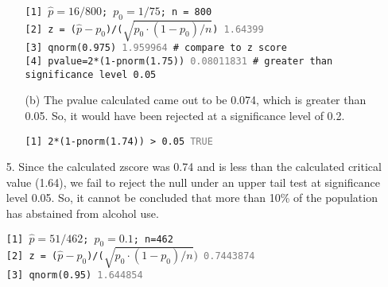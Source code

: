 \documentclass[12pt]{article}
\begin{document}
\begin{enumerate}
\begin{enumerate}
		\begin{tcolorbox}[colback=white, title=Work, coltitle=white]
			\texttt{[1] $\hat{p}=16/800$; $p_0 = 1/75$; n = 800}\\
			\texttt{[2] z = ($\hat{p} - p_0$)/($\sqrt{p_0\cdot(1-p_0)/n}$) \textcolor{gray}{1.64399}}\\
			\texttt{[3] qnorm(0.975) \textcolor{gray}{1.959964} \# compare to z score}\\
			\texttt{[4] pvalue=2*(1-pnorm(1.75)) \textcolor{gray}{0.08011831} \# greater than significance level 0.05}\\ 
		\end{tcolorbox}

			\item[(b)] The pvalue calculated came out to be 0.074, which is greater than 0.05. So, 
				it would have been rejected at a significance level of 0.2.
		\begin{tcolorbox}[colback=white, title=Work, coltitle=white]
			\texttt{[1] 2*(1-pnorm(1.74)) > 0.05 \textcolor{gray}{TRUE}}\\
		\end{tcolorbox}
		\end{enumerate}
	\item[5.] Since the calculated zscore was 0.74 and is less than the calculated critical value (1.64), we fail to reject the null under an upper 
		tail test at significance level 0.05. So, it cannot be concluded that more than 10\% of the population has abstained from alcohol use.

		\begin{tcolorbox}[colback=white, title=Work, coltitle=white]
					 \texttt{[1] $\hat{p} = 51/462$; $p_0 = 0.1$; n=462}\\
					 \texttt{[2] z = ($\hat{p} -p_0$)/($\sqrt{p_0\cdot(1-p_0)/n})$ \textcolor{gray}{0.7443874}}\\
					 \texttt{[3] qnorm(0.95) \textcolor{gray}{1.644854}}
				 \end{tcolorbox}
\end{enumerate}
\end{document}
